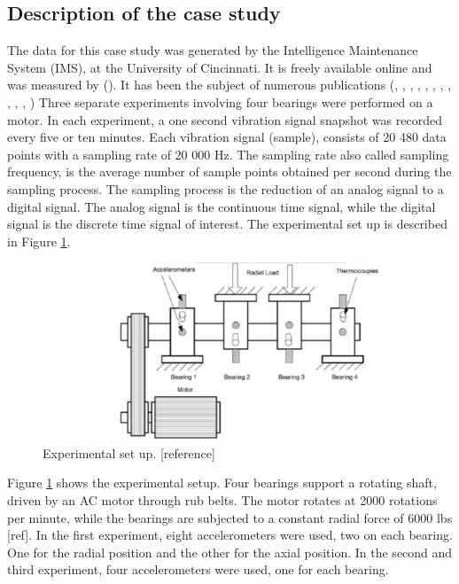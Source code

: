 \documentclass[../Main/thesis.tex]{subfiles}
\begin{document}
\subsection{Description of the case study}
\label{sec:case}
The data for this case study was generated by the Intelligence Maintenance System (IMS), at the University of Cincinnati. It is freely available online and was measured by (\cite{lee2007}). It has been the subject of numerous publications
(\cite{hai2006}, \cite{mejia2010}, \cite{fangtao2011}, \cite{mejia2011}, \cite{mortada2011}, \cite{rego2011}, \cite{yacout2012}, \cite{sergey2012} , \cite{of2012}, \cite{jianbo2012a}, \cite{jianbo2012b}, \cite{mejia2012} )
\justify
Three separate experiments involving four bearings were performed on a motor. In each experiment, a one second vibration signal snapshot was recorded every five or ten minutes. Each vibration signal (sample), consists of 20 480 data points with a sampling rate of 20 000 Hz.
The sampling rate also called sampling frequency, is the average number of sample points obtained per second during the sampling process. The sampling process is the reduction of an analog signal to a digital signal. The analog signal is the continuous time signal, while the digital signal is the discrete time signal of interest. The experimental set up is described in Figure \ref{fig:exp}.
\begin{figure}[H] %
   \centering
   \includegraphics[width=7in]{../fig/experiment} 
   \caption{Experimental set up. [reference]}
   \label{fig:exp}
\end{figure}
\justify
Figure \ref{fig:exp} shows the experimental setup. Four bearings support a rotating shaft, driven by an AC motor through rub belts. The motor rotates at 2000 rotations per minute, while the bearings are subjected to a constant radial force of 6000 lbs [ref]. In the first experiment, eight accelerometers were used, two on each bearing. One for the radial position and the other for the axial position. In the second and third experiment, four accelerometers were used, one for each bearing.
\end{document}
